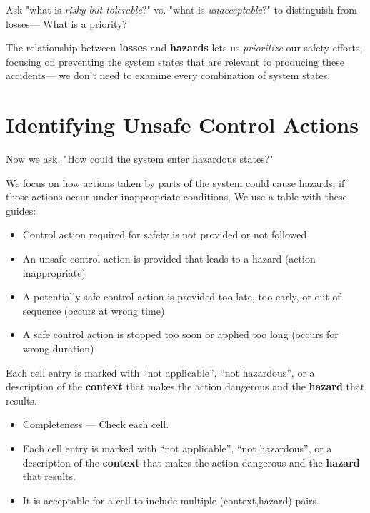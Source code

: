 \documentclass[letterpaper]{tufte-book}
\begin{document}

Ask "what is \emph{risky but tolerable}?" vs. "what is \emph{unacceptable}?" to distinguish from losses--- What is a priority?


The relationship between \textbf{losses} and \textbf{hazards} lets us \emph{prioritize} our safety efforts, focusing on preventing the system states that are relevant to producing these accidents--- we don't need to examine every combination of system states.

\section{Identifying Unsafe Control Actions}


Now we ask, "How could the system enter hazardous states?"

We focus on how actions taken by parts of the system could cause hazards, if those actions occur under inappropriate conditions. 
We use a table with these guides:\begin{itemize}
\setlength{\itemsep}{0pt}
\setlength{\parskip}{.25em}
\item Control action required for safety is not provided or not followed
\item An unsafe control action is provided that leads to a hazard (action inappropriate)
\item A potentially safe control action is provided too late, too early, or out of sequence (occurs at wrong time)
\item A safe control action is stopped too soon or applied too long (occurs for wrong duration)
\end{itemize}

Each cell entry is marked with ``not applicable'', ``not hazardous'', or a description of the \textbf{context} that makes the action dangerous and the \textbf{hazard} that results. 




\begin{itemize}
\setlength{\itemsep}{0pt}
\setlength{\parskip}{.25em}
\item Completeness --- Check each cell.
\item Each cell entry is marked with ``not applicable'', ``not hazardous'', or a description of the \textbf{context} that makes the action dangerous and the \textbf{hazard} that results. 
\item It is acceptable for a cell to include multiple (context,hazard) pairs.
\end{itemize}
\end{document}
